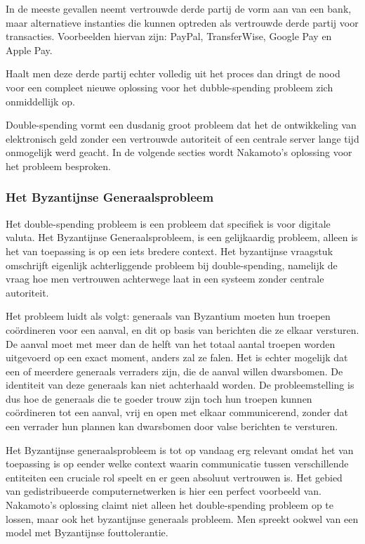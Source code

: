 			In de meeste gevallen neemt vertrouwde derde partij de vorm aan van een bank, maar alternatieve instanties die kunnen optreden als vertrouwde derde partij voor transacties. Voorbeelden hiervan zijn: PayPal, TransferWise, Google Pay en Apple Pay.
		
			Haalt men deze derde partij echter volledig uit het proces dan dringt de nood voor een compleet nieuwe oplossing voor het dubble-spending probleem zich onmiddellijk op.
			
			Double-spending vormt een dusdanig groot probleem dat het de ontwikkeling van elektronisch geld zonder een vertrouwde autoriteit of een centrale server lange tijd onmogelijk werd geacht. In de volgende secties wordt Nakamoto’s oplossing voor het probleem besproken. 
			
			\subsubsection{Het Byzantijnse Generaalsprobleem}
			Het double-spending probleem is een probleem dat specifiek is voor digitale valuta. Het Byzantijnse Generaalsprobleem, is een gelijkaardig probleem, alleen is het van toepassing is op een iets bredere context. Het byzantijnse vraagstuk omschrijft eigenlijk achterliggende probleem bij double-spending, namelijk de vraag hoe men vertrouwen achterwege laat in een systeem zonder centrale autoriteit.
			
			Het probleem luidt als volgt: generaals van Byzantium moeten hun troepen coördineren voor een aanval, en dit op basis van berichten die ze elkaar versturen. De aanval moet met meer dan de helft van het totaal aantal troepen worden uitgevoerd op een exact moment, anders zal ze falen. Het is echter mogelijk dat een of meerdere generaals verraders zijn, die de aanval willen dwarsbomen. De identiteit van deze generaals kan niet achterhaald worden. De probleemstelling is dus hoe de generaals die te goeder trouw zijn toch hun troepen kunnen coördineren tot een aanval, vrij en open met elkaar communicerend, zonder dat een verrader hun plannen kan dwarsbomen door valse berichten te versturen.
			
			Het Byzantijnse generaalsprobleem is tot op vandaag erg relevant omdat het van toepassing is op eender welke context waarin communicatie tussen verschillende entiteiten een cruciale rol speelt en er geen absoluut vertrouwen is. Het gebied van gedistribueerde computernetwerken is hier een perfect voorbeeld van. Nakamoto's oplossing claimt niet alleen het double-spending probleem op te lossen, maar ook het byzantijnse generaals probleem. Men spreekt ookwel van een model met Byzantijnse fouttolerantie.
			
